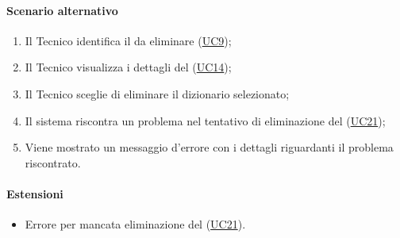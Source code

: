\paragraph*{Scenario alternativo}
\begin{enumerate}
  \item Il Tecnico identifica il  da eliminare (\hyperref[UC9]{UC9});
  \item Il Tecnico visualizza i dettagli del  (\hyperref[UC14]{UC14});  
  \item Il Tecnico sceglie di eliminare il dizionario selezionato;
  \item Il sistema riscontra un problema nel tentativo di eliminazione del  (\hyperref[UC21]{UC21});
  \item Viene mostrato un messaggio d'errore con i dettagli riguardanti il problema riscontrato.
\end{enumerate}

\paragraph*{Estensioni}
\begin{itemize}
  \item Errore per mancata eliminazione del  (\hyperref[UC21]{UC21}).
\end{itemize}
